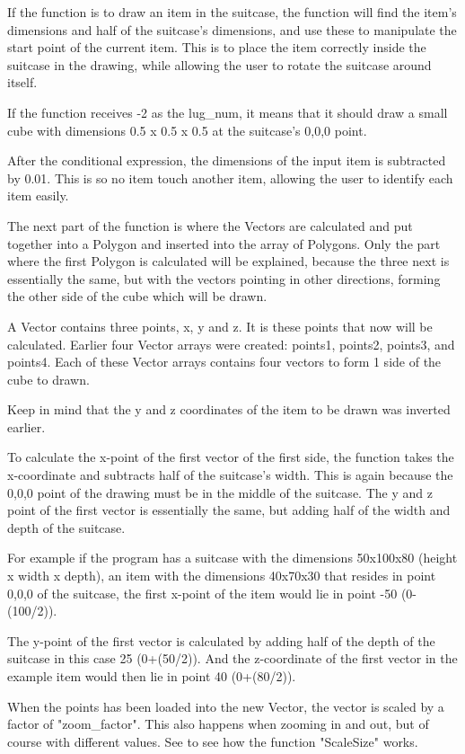 If the function is to draw an item in the suitcase, the function will find the item's dimensions and half of the suitcase's dimensions, and use these to manipulate the start point of the current item. This is to place the item correctly inside the suitcase in the drawing, while allowing the user to rotate the suitcase around itself. 

If the function receives -2 as the lug\_num, it means that it should draw a small cube with dimensions 0.5 x 0.5 x 0.5 at the suitcase's 0,0,0 point.

After the conditional expression, the dimensions of the input item is subtracted by 0.01. This is so no item touch another item, allowing the user to identify each item easily. 

The next part of the function is where the Vectors are calculated and put together into a Polygon and inserted into the array of Polygons. Only the part where the first Polygon is calculated will be explained, because the three next is essentially the same, but with the vectors pointing in other directions, forming the other side of the cube which will be drawn.

A Vector contains three points, x, y and z. It is these points that now will be calculated. Earlier four Vector arrays were created: points1, points2, points3, and points4. Each of these Vector arrays contains four vectors to form 1 side of the cube to drawn. 

Keep in mind that the y and z coordinates of the item to be drawn was inverted earlier. 

To calculate the x-point of the first vector of the first side, the function takes the x-coordinate and subtracts half of the suitcase's width. This is again because the 0,0,0 point of the drawing must be in the middle of the suitcase. The y and z point of the first vector is essentially the same, but adding half of the width and depth of the suitcase.

For example if the program has a suitcase with the dimensions 50x100x80 (height x width x depth), an item with the dimensions 40x70x30 that resides in point 0,0,0 of the suitcase, the first x-point of the item would lie in point -50 (0-(100/2)). 

The y-point of the first vector is calculated by adding half of the depth of the suitcase in this case 25 (0+(50/2)). And the z-coordinate of the first vector in the example item would then lie in point 40 (0+(80/2)).

When the points has been loaded into the new Vector, the vector is scaled by a factor of "zoom\_factor". This also happens when zooming in and out, but of course with different values. See  to see how the function "ScaleSize" works. 


